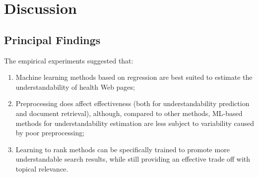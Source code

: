 
\section*{Discussion}






\subsection*{Principal Findings}

The empirical experiments suggested that:

\vspace{-4pt}
\begin{enumerate}[leftmargin=*]
	\item Machine learning methods based on regression are best suited to estimate the understandability of health Web pages;
	\item Preprocessing does affect effectiveness (both for understandability prediction and document retrieval), although, compared to other methods, ML-based methods for understandability estimation are less subject to variability caused by poor preprocessing;
	\item Learning to rank methods can be specifically trained to promote more understandable search results, while still providing an effective trade off with topical relevance.
\end{enumerate} 


